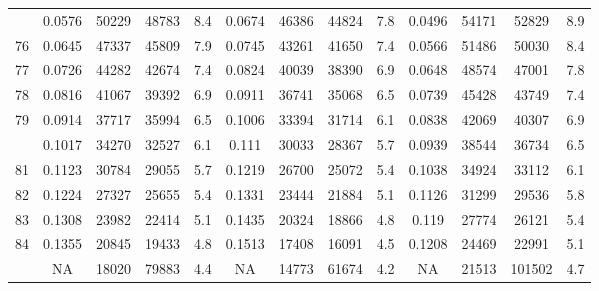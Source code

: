 \documentclass[
  14pt,
]{article}
\begin{document}
\begin{longtable}[t]{lcccccccccccc}
\addlinespace
75 & 0.0576 & 50229 & 48783 & 8.4 & 0.0674 & 46386 & 44824 & 7.8 & 0.0496 & 54171 & 52829 & 8.9\\
76 & 0.0645 & 47337 & 45809 & 7.9 & 0.0745 & 43261 & 41650 & 7.4 & 0.0566 & 51486 & 50030 & 8.4\\
77 & 0.0726 & 44282 & 42674 & 7.4 & 0.0824 & 40039 & 38390 & 6.9 & 0.0648 & 48574 & 47001 & 7.8\\
78 & 0.0816 & 41067 & 39392 & 6.9 & 0.0911 & 36741 & 35068 & 6.5 & 0.0739 & 45428 & 43749 & 7.4\\
79 & 0.0914 & 37717 & 35994 & 6.5 & 0.1006 & 33394 & 31714 & 6.1 & 0.0838 & 42069 & 40307 & 6.9\\
\addlinespace
80 & 0.1017 & 34270 & 32527 & 6.1 & 0.111 & 30033 & 28367 & 5.7 & 0.0939 & 38544 & 36734 & 6.5\\
81 & 0.1123 & 30784 & 29055 & 5.7 & 0.1219 & 26700 & 25072 & 5.4 & 0.1038 & 34924 & 33112 & 6.1\\
82 & 0.1224 & 27327 & 25655 & 5.4 & 0.1331 & 23444 & 21884 & 5.1 & 0.1126 & 31299 & 29536 & 5.8\\
83 & 0.1308 & 23982 & 22414 & 5.1 & 0.1435 & 20324 & 18866 & 4.8 & 0.119 & 27774 & 26121 & 5.4\\
84 & 0.1355 & 20845 & 19433 & 4.8 & 0.1513 & 17408 & 16091 & 4.5 & 0.1208 & 24469 & 22991 & 5.1\\
\addlinespace
85 & NA & 18020 & 79883 & 4.4 & NA & 14773 & 61674 & 4.2 & NA & 21513 & 101502 & 4.7\\*
\end{longtable}
\end{document}
